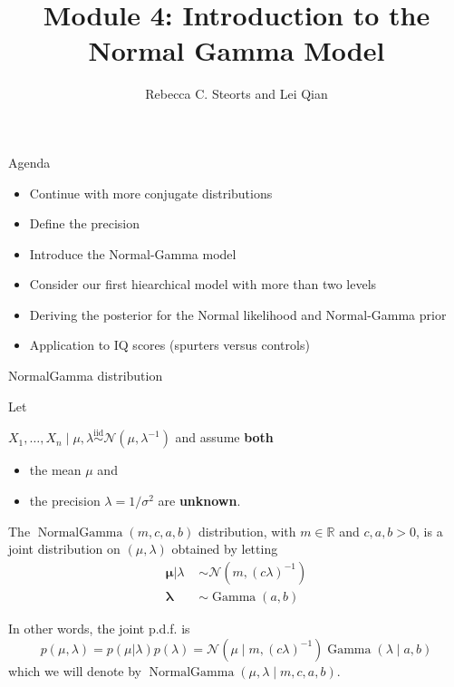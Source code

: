 \documentclass[
  ignorenonframetext,
]{beamer}
\title{Module 4: Introduction to the Normal Gamma Model}
\author{Rebecca C. Steorts and Lei Qian}
\date{}
\providecommand{\tightlist}{%
  \setlength{\itemsep}{0pt}\setlength{\parskip}{0pt}}
\DeclareMathOperator*{\Ga}{Gamma}
\DeclareMathOperator*{\NormalGamma}{NormalGamma}
\newcommand{\R}{\mathbb{R}}
\newcommand{\N}{\mathcal{N}}
\newcommand{\iid}{\stackrel{\mathrm{iid}}{\sim}}
\begin{document}
\frame{\titlepage}

\begin{frame}{Agenda}
\protect\hypertarget{agenda}{}

\begin{itemize}
\tightlist
\item
  Continue with more conjugate distributions
\item
  Define the precision
\item
  Introduce the Normal-Gamma model
\item
  Consider our first hiearchical model with more than two levels
\item
  Deriving the posterior for the Normal likelihood and Normal-Gamma
  prior
\item
  Application to IQ scores (spurters versus controls)
\end{itemize}

\end{frame}

\begin{frame}{NormalGamma distribution}
\protect\hypertarget{normalgamma-distribution}{}

Let

\(X_1,\dotsc,X_n\mid \mu,\lambda \iid\N(\mu,\lambda^{-1})\) and assume
\textbf{both}

\begin{itemize}
\tightlist
\item
  the mean \(\mu\) and
\item
  the precision \(\lambda= 1/\sigma^2\) are \textbf{unknown}.
\end{itemize}

The \(\NormalGamma(m,c,a,b)\) distribution, with \(m\in\R\) and
\(c,a,b>0\), is a joint distribution on \((\mu,\lambda)\) obtained by
letting \begin{align*}
\bm\mu|\lambda \,\,&\sim \N(m,(c\lambda)^{-1})\\
\bm\lambda \,\,&\sim\Ga(a,b)
\end{align*}

In other words, the joint p.d.f. is
\[ p(\mu,\lambda) = p(\mu|\lambda) p(\lambda) =\N(\mu\mid m,(c\lambda)^{-1})\Ga(\lambda\mid a,b) \]
which we will denote by \(\NormalGamma(\mu,\lambda\mid m,c,a,b).\)

\end{frame}
\end{document}
